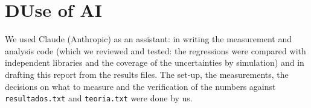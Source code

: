 \documentclass[9pt,a4paper,twocolumn]{extarticle}
\begin{document}
\section*{D\quad Use of AI}
We used Claude (Anthropic) as an assistant: in writing the measurement and analysis code (which we reviewed and tested: the regressions were compared with independent libraries and the coverage of the uncertainties by simulation) and in drafting this report from the results files. The set-up, the measurements, the decisions on what to measure and the verification of the numbers against \texttt{resultados.txt} and \texttt{teoria.txt} were done by us.
\end{document}
